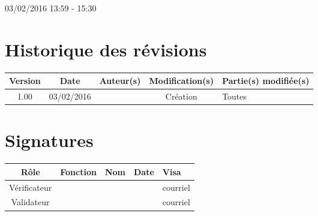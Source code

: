 \documentclass [a4paper] {article}
\begin{document}
03/02/2016			 				%
\hfill   
\hfill 	 13:59 - 15:30 				%



\section*{Historique des révisions}
\begin{center}
			\begin{tabular}{| c | c | c | c | p{4cm} |}
				\hline
				\rowcolor{Gray}
				Version & Date & Auteur(s) & Modification(s) & Partie(s) modifiée(s)		 \\
				\hline
				1.00 & 03/02/2016 & \Kafui & Création & Toutes \\
		\hline		
			\end{tabular}
		\end{center}

\section*{Signatures}

		\begin{center}
			\begin{tabular}{| c | c | c | c | p{4cm} |}
				\hline
				\rowcolor{Gray}
				Rôle & Fonction & Nom & Date & Visa		 \\
				\hline
				Vérificateur & \RQA & \Pierre &  & courriel \\[30pt]
				\hline
				Validateur & \CP & \Sergi & & courriel \\[30pt]	
				\hline
			\end{tabular}
		\end{center}
		
\newpage		




\end{document}
